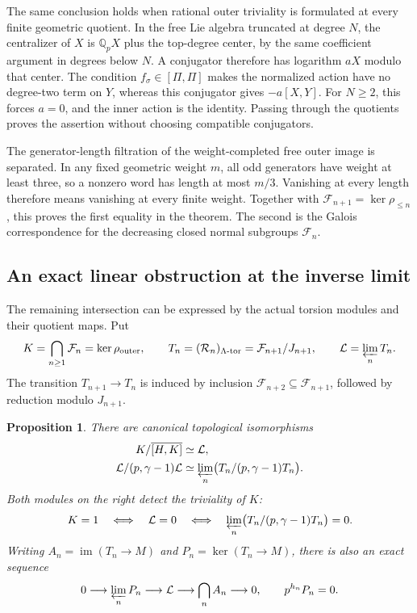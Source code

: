 \documentclass[11pt]{article}
\newtheorem{proposition}[theorem]{Proposition}
\theoremstyle{definition}\newtheorem{definition}[theorem]{Definition}
\begin{document}
The same conclusion holds when rational outer triviality is formulated at every finite geometric quotient. In the free Lie algebra truncated at degree \(N\), the centralizer of \(X\) is \(\mathbb Q_pX\) plus the top-degree center, by the same coefficient argument in degrees below \(N\). A conjugator therefore has logarithm \(aX\) modulo that center. The condition \(f_\sigma\in[\Pi,\Pi]\) makes the normalized action have no degree-two term on \(Y\), whereas this conjugator gives \(-a[X,Y]\). For \(N\geq2\), this forces \(a=0\), and the inner action is the identity. Passing through the quotients proves the assertion without choosing compatible conjugators.

The generator-length filtration of the
weight-completed free outer image is separated.
In any fixed geometric weight \(m\), all odd
generators have weight at least three, so a
nonzero word has length at most \(m/3\).
Vanishing at every length therefore means
vanishing at every finite weight.
Together with \(\mathcal F_{n+1}=\ker\rho_{\leq n}\),
this proves the first equality in the theorem.  The second is
the Galois correspondence for the decreasing
closed normal subgroups \(\mathcal F_n\).


\subsection{An exact linear obstruction at the inverse limit}
\label{sec:limit-relation-module}

The remaining intersection can be expressed by the actual
torsion modules and their quotient maps. Put
\[
 K=\bigcap_{n\geq1}\mathcal F_n=\ker\rho_{\mathrm{outer}},\qquad
 T_n=(\mathcal R_n)_{\Lambda\text{-tor}}
       =\mathcal F_{n+1}/J_{n+1},\qquad
 \mathcal L=\varprojlim_nT_n.
\]
The transition \(T_{n+1}\to T_n\) is induced by inclusion
\(\mathcal F_{n+2}\subseteq \mathcal F_{n+1}\), followed by reduction modulo
\(J_{n+1}\).

\begin{proposition}\label{prop:limit-relation-module}
There are canonical topological isomorphisms
\begin{align}
 K/\overline{[H,K]}&\simeq\mathcal L,
 \label{eq:limit-relation-iso}\\
 \mathcal L/(p,\gamma-1)\mathcal L
 &\simeq
 \varprojlim_n\bigl(T_n/(p,\gamma-1)T_n\bigr).
 \label{eq:limit-mod-p-iso}
\end{align}
Both modules on the right detect the triviality of \(K\):
\begin{equation}\label{eq:limit-linear-obstruction}
 K=1\quad\Longleftrightarrow\quad
 \mathcal L=0\quad\Longleftrightarrow\quad
 \varprojlim_n\bigl(T_n/(p,\gamma-1)T_n\bigr)=0.
\end{equation}
Writing \(A_n=\operatorname{im}(T_n\to M)\) and
\(P_n=\ker(T_n\to M)\), there is also an exact sequence
\begin{equation}\label{eq:limit-abelian-torsion}
 0\longrightarrow\varprojlim_nP_n
 \longrightarrow\mathcal L
 \longrightarrow\bigcap_nA_n
 \longrightarrow0,
 \qquad p^{h_n}P_n=0.
\end{equation}
\end{proposition}
\end{document}
